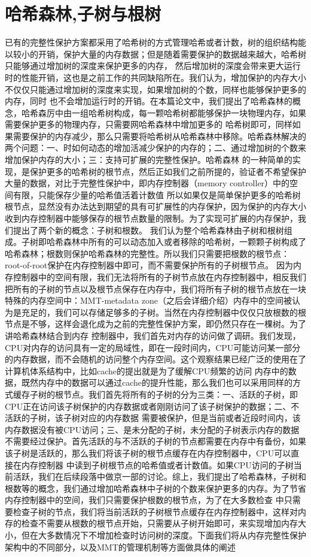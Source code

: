 \section{哈希森林,子树与根树}
已有的完整性保护方案都采用了哈希树的方式管理哈希或者计数，树的组织结构能以较小的开销，保护大量的内存数据；但是随着需要保护的数据越来越大，哈希树只能够通过增加树的深度来保护更多的内存，
然后增加树的深度会带来更大运行时的性能开销，这也是之前工作的共同缺陷所在。我们认为，增加保护的内存大小不仅仅只能通过增加树的深度来实现，如果增加树的个数，同样也能够保护更多的内存，同时
也不会增加运行时的开销。在本篇论文中，我们提出了哈希森林的概念，哈希森厉中由一组哈希树构成，每一颗哈希树都能够保护一块物理内存，如果需要保护更多的物理内存，只需要网哈希森林中增加更多的
哈希树即可，同样如果需要保护的内存减少，那么只需要将哈希树从哈希森林中移除。哈希森林解决的两个问题：一、时如何动态的增加活减少保护的内存的；二、通过增加树的个数来增加保护内存的大小；三：支持可扩展的完整性保护。哈希森林
的一种简单的实现，是保护更多的哈希树的根节点，然后正如我们之前所提的，验证者不希望保护大量的数据，对比于完整性保护中，即内存控制器（memory controller）中的空间有限，只能保存少量的哈希值活着计数值
所以如果仅是简单保护更多的哈希树根节点，显然没有办法达到期望的具有可扩展性的内存保护，因为保护的内存大小收到内存控制器中能够保存的根节点数量的限制。为了实现可扩展的内存保护，我们提出了两个新的概念：子树和根数。
我们认为整个哈希森林由子树和根树组成。子树即哈希森林中所有的可以动态加入或者移除的哈希树，一颗颗子树构成了哈希森林；根数则保护哈希森林的完整性。所以我们只需要把根数的根节点：root-of-root保护在内存控制器中即可，而不需要保护所有的子树根节点。
因为内存控制器中的空间有限，我们无法将所有的子树节点放在内存控制器中，相反我们把所有的子树的节点以及根节点保存在内存中，我们将所有子树的根节点放在一块特殊的内存空间中：MMT-metadata zone（之后会详细介绍）内存中的空间被认为是充足的，我们可以存储足够多的子树。当然在内存控制器中仅仅只放根数的根节点是不够，这样会退化成为之前的完整性保护方案，即仍然只存在一棵树。为了讲哈希森林结合到内存
控制器中，我们首先对内存的访问做了调研。我们发现，CPU对内存的访问具有一定的局域性，即在一段时间内，CPU可能访问某一部分的内存数据，而不会随机的访问整个内存空间。这个观察结果已经广泛的使用在了计算机体系结构中，比如cache的提出就是为了缓解CPU频繁的访问
内存中的数据，既然内存中的数据可以通过cache的提升性能，那么我们也可以采用同样的方式缓存子树的根节点。我们首先将所有的子树的分为三类：一、活跃的子树，即CPU正在访问该子树保护的内存数据或者刚刚访问了该子树保护的数据；二、不活跃的子树，该子树对应的内存数据
需要被保护，但是当前或者近段时间内，该内存数据没有被CPU访问；三、是未分配的子树，未分配的子树表示内存的数据不需要经过保护。首先活跃的与不活跃的子树的节点都需要在内存中有备份，如果该子树是活跃的，那么我们将该子树的根节点缓存在内存控制器中，CPU可以直接在内存控制器
中读到子树根节点的哈希值或者计数值。如果CPU访问的子树当前活跃，我们在后续段落中做京一部的讨论。综上，我们提出了哈希森林，子树和根数等的概念，我们通过增加哈希森林中子树的个数来保护更多的内存。为了节省内存控制器中的空间，我们只需要保护根数的根节点，为了在大多数检查
中只需要检查子树的节点，我们将当前活跃的子树根节点缓存在内存控制器中，这样对内存的检查不需要从根数的根节点开始，只需要从子树开始即可，来实现增加内存大小，但在大多数情况下不增加检查时访问树的深度。下面我们将从内存完整性保护架构中的不同部分，以及MMT的管理机制等方面做具体的阐述

